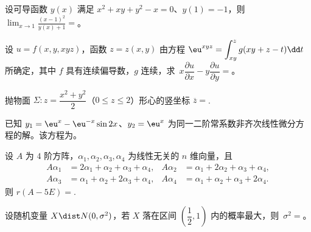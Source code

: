 \begin{question}[index=11]
设可导函数 $y(x)$ 满足 $x^2+xy+y^2-x=0$、$y(1)=-1$，则 $\displaystyle\lim_{x\to1}\frac{(x-1)^2}{y(x)+1}=$\fillin。
\end{question}
\QuestionBreak

\begin{question}[index=12]
设 $u=f(x,y,xyz)$，函数 $z=z(x,y)$ 由方程 $\eu^{xyz}=\displaystyle\int_{xy}^z g(xy+z-t)\dd t$ 所确定，其中 $f$ 具有\allowbreak\mbox{连续偏导数}，$g$ 连续，\allowbreak\mbox{求 $x\dfrac{\partial u}{\partial x}-y\dfrac{\partial u}{\partial y}=$\fillin。}
\end{question}
\QuestionBreak

\begin{question}[index=13]
抛物面 $\Sigma\colon z=\dfrac{x^2+y^2}{2}$（$0\le z\le2$）形心的竖坐标 $\overline z=$\fillin.
\end{question}
\QuestionBreak

\begin{question}[index=14]
已知 $y_1=\eu^x-\eu^{-x}\sin2x$、$y_2=\eu^x$ 为同一二阶常系数非齐次线性微分方程的解。该方程为\fillin。
\end{question}
\QuestionBreak

\begin{question}[index=15]
设 $A$ 为 $4$ 阶方阵，$\alpha_1,\alpha_2,\alpha_3,\alpha_4$ 为线性无关的 $n$ 维向量，且
\[
\begin{aligned}
A\alpha_1&=2\alpha_1+\alpha_2+\alpha_3+\alpha_4,&
A\alpha_2&=\alpha_1+2\alpha_2+\alpha_3+\alpha_4,\\
A\alpha_3&=\alpha_1+\alpha_2+2\alpha_3+\alpha_4,&
A\alpha_4&=\alpha_1+\alpha_2+\alpha_3+2\alpha_4.
\end{aligned}
\]
则 $r(A-5E)=$\fillin.
\end{question}
\QuestionBreak

\begin{question}[index=16]
设随机变量 $X\dist N(0,\sigma^2)$，若 $X$ 落在区间 $\left(\dfrac12,1\right)$ 内的概率最大，\allowbreak\mbox{则 $\sigma^2=$\fillin。}
\end{question}
